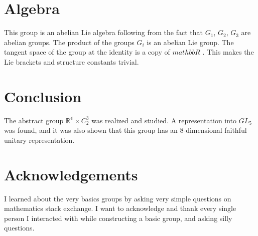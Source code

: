 \documentclass{article}
\begin{document}
\section{Algebra}
    This group is an abelian Lie algebra following from the fact that $G_1$, $G_2$,  $G_3$ are abelian groups. The product of the groups $G_i$ is an abelian Lie group. The tangent space of the group at the identity is a copy of $mathbb{R}$ . This makes the Lie brackets and structure constants trivial.  

\section{Conclusion}
 The abstract group  $\mathbb{R^4} \times C_2^3$ was realized and studied. A representation into $GL_5$ was found, and it was also shown that this group has an  8-dimensional faithful unitary representation.
 
\section*{Acknowledgements}

I learned about the very basics groups by asking very simple questions on mathematics stack exchange. I want to acknowledge and thank every single person I interacted with while constructing a basic group, and asking silly questions.
 
\printbibliography
\end{document}
